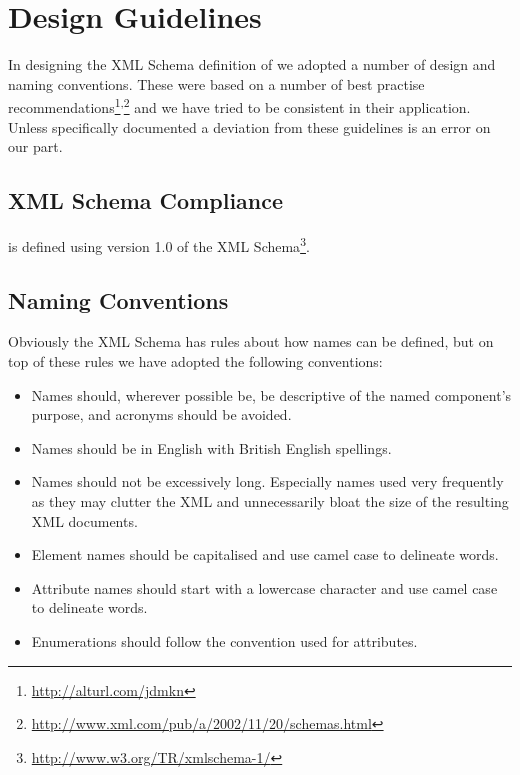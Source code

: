 \section{Design Guidelines}

In designing the XML Schema definition of \pharmml we adopted a number
of design and naming conventions. These were based on a number of best
practise recommendations\footnote{\url{http://alturl.com/jdmkn}}\textsuperscript{,}\footnote{\url{http://www.xml.com/pub/a/2002/11/20/schemas.html}}
and we have tried to be consistent in their application. Unless
specifically documented a deviation from these guidelines is an error on
our part.


\subsection{XML Schema Compliance}

\pharmml is defined using version 1.0 of the XML Schema\footnote{\url{http://www.w3.org/TR/xmlschema-1/}}.

\subsection{Naming Conventions}

Obviously the XML Schema has rules about how names can be defined, but on
top of these rules we have adopted the following conventions:

\begin{itemize}
\item Names should, wherever possible be, be descriptive of the named
  component's purpose, and acronyms should be avoided.
\item Names should be in English with British English spellings.
\item Names should not be excessively long. Especially names used very
  frequently as they may clutter the XML and unnecessarily bloat the
  size of the resulting XML documents.
\item Element names should be capitalised and use camel case to
  delineate words.
\item Attribute names should start with a lowercase character and use
  camel case to delineate words.
\item Enumerations should follow the convention used for attributes.
\end{itemize}

